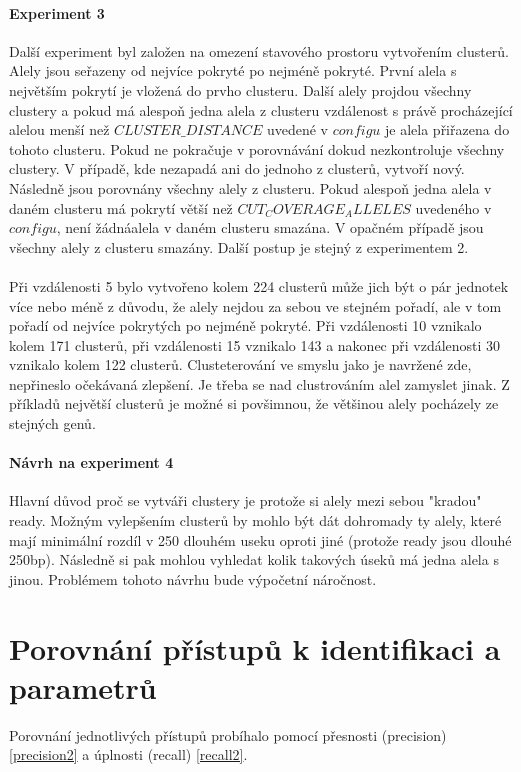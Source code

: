 \documentclass[czech,DP]{thesiskiv}
\numberwithin{equation}{section}
\begin{document}
\subsubsection{Experiment 3}
Další experiment byl založen na omezení stavového prostoru vytvořením clusterů. Alely jsou seřazeny od nejvíce pokryté po nejméně pokryté. První alela s největším pokrytí je vložená do prvho clusteru. Další alely projdou všechny clustery a pokud má alespoň jedna alela z clusteru vzdálenost s právě procházející alelou menší než $CLUSTER\_DISTANCE$ uvedené v $configu$ je alela přiřazena do tohoto clusteru. Pokud ne pokračuje v porovnávání dokud nezkontroluje všechny clustery. V případě, kde nezapadá ani do jednoho z clusterů, vytvoří nový. Následně jsou porovnány všechny alely z clusteru. Pokud alespoň jedna alela v daném clusteru má pokrytí větší než $CUT_COVERAGE_ALLELES$ uvedeného v $configu$, není žádnáalela v daném clusteru smazána. V opačném případě jsou všechny alely z clusteru smazány. Další postup je stejný z experimentem 2.
\\
\\
Při vzdálenosti 5 bylo vytvořeno kolem 224 clusterů může jich být o pár jednotek více nebo méně z důvodu, že alely nejdou za sebou ve stejném pořadí, ale v tom pořadí od nejvíce pokrytých po nejméně pokryté. Při vzdálenosti 10 vznikalo kolem 171 clusterů, při vzdálenosti 15 vznikalo 143 a nakonec při vzdálenosti 30 vznikalo kolem 122 clusterů. Clusteterování ve smyslu jako je navržené zde, nepřineslo očekávaná zlepšení. Je třeba se nad clustrováním alel zamyslet jinak. Z příkladů největší clusterů je možné si povšimnou, že většinou alely pocházely ze stejných genů.


\subsubsection{Návrh na experiment 4}
Hlavní důvod proč se vytváři clustery je protože si alely mezi sebou "kradou" ready. Možným vylepšením clusterů by mohlo být dát dohromady ty alely, které mají minimální rozdíl v 250 dlouhém useku oproti jiné (protože ready jsou dlouhé 250bp). Následně si pak mohlou vyhledat kolik takových úseků má jedna alela s jinou. Problémem tohoto návrhu bude výpočetní náročnost.
 

\chapter{Porovnání přístupů k identifikaci a parametrů}
Porovnání jednotlivých přístupů probíhalo pomocí přesnosti (precision) \ref{precision2} a úplnosti (recall) \ref{recall2}. 
\end{document}
